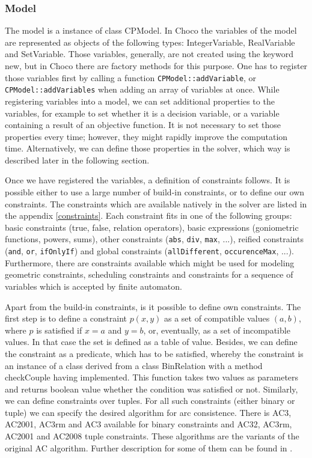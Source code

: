 \subsubsection{Model}
The model is a instance of class CPModel. In Choco the variables of the model are represented
as objects of the following types: IntegerVariable, RealVariable and SetVariable. Those 
variables, generally, are not created using the keyword new, but in Choco there are
factory methods for this purpose. One has to register those variables first by calling
a function \texttt{CPModel::addVariable}, or \texttt{CPModel::addVariables} when adding an array of variables at once.
While registering variables into a model, we can set additional properties to the variables, 
for example to set whether it is a decision variable, or a variable containing a result
of an objective function. It is not necessary to set those properties every time; however,
they might rapidly improve the computation time. Alternatively, we can define those properties
in the solver, which way is described later in the following section.

Once we have registered the variables, a definition of constraints follows. It is possible
either to use a large number of build-in constraints, or to define our own constraints.
The constraints which are available natively in the solver are listed in the appendix \ref{constraints}.
Each constraint fits in one of the following groups: basic constraints (true, false, relation operators),
basic expressions (goniometric functions, powers, sums), other constraints (\texttt{abs}, \texttt{div}, \texttt{max}, ...),
reified constraints (\texttt{and}, \texttt{or}, \texttt{ifOnlyIf}) and global constraints (\texttt{allDifferent}, 
\texttt{occurenceMax}, ...). Furthermore, there are constraints available which might be used for modeling geometric constraints,
scheduling constraints and constraints for a sequence of variables which is accepted by finite automaton.

Apart from the build-in constraints, is it possible to define own constraints. The first step is to define 
a constraint $p(x,y)$ as a set of compatible values $(a,b)$, where $p$ is satisfied
if $x=a$ and $y=b$, or, eventually, as a set of incompatible values. In that case the
set is defined as a table of value. Besides, we can define the constraint as a predicate, which has to
be satisfied, whereby the constraint is an instance of a class derived from a class BinRelation
with a method checkCouple having implemented. This function takes two values as parameters and 
returns boolean value whether the condition was satisfied or not. Similarly, we can define 
constraints over tuples. For all such constraints (either binary or tuple) we can specify the 
desired algorithm for arc consistence. There is AC3, AC2001, AC3rm and AC3 available for binary constraints and
 AC32, AC3rm, AC2001 and AC2008 tuple constraints. These algorithms are the variants of
 the original AC algorithm. Further description for some of them can be found in \cite{bartak:ogcp}.
 
